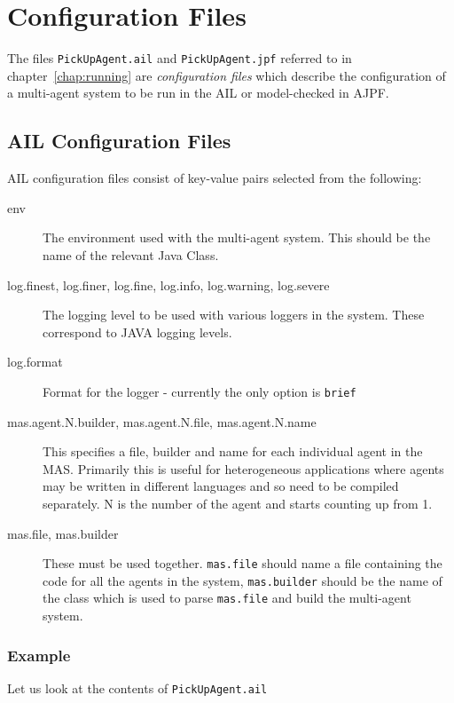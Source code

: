 \chapter{Configuration Files}
\label{chap:configuration}

The files \texttt{PickUpAgent.ail} and \texttt{PickUpAgent.jpf} referred to in chapter~\ref{chap:running} are \emph{configuration files} which describe the configuration of a multi-agent system to be run in the AIL or model-checked in AJPF.

\section{AIL Configuration Files}

AIL configuration files consist of key-value pairs selected from the following:

\begin{description}
\item[env] The environment used with the multi-agent system.  This should be the name of the relevant Java Class.  
\item[log.finest, log.finer, log.fine, log.info, log.warning, log.severe] The logging level to be used with various loggers in the system.  These correspond to JAVA logging levels.
\item[log.format] Format for the logger - currently the only option is \texttt{brief}
\item[mas.agent.N.builder, mas.agent.N.file, mas.agent.N.name] This specifies a file, builder and name for each individual agent in the MAS.  Primarily this is useful for heterogeneous applications where agents may be written in different languages and so need to be compiled separately.  N is the number of the agent and starts counting up from 1.
\item[mas.file, mas.builder] These must be used together.  \texttt{mas.file} should name a file containing the code for all the agents in the system, \texttt{mas.builder} should be the name of the class which is used to parse \texttt{mas.file} and build the multi-agent system.
\end{description}

\subsection{Example}
Let us look at the contents of \texttt{PickUpAgent.ail}

